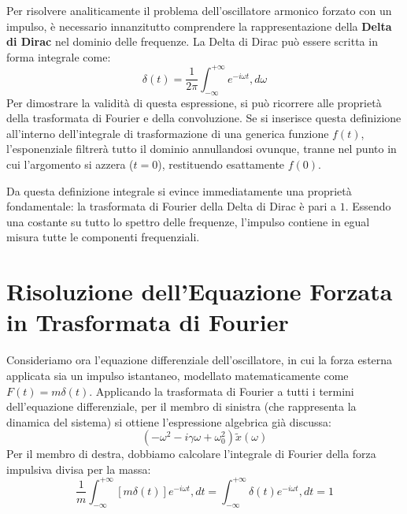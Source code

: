 Per risolvere analiticamente il problema dell'oscillatore armonico forzato con un impulso, è necessario innanzitutto comprendere la rappresentazione della \textbf{Delta di Dirac} nel dominio delle frequenze. La Delta di Dirac può essere scritta in forma integrale come:
\begin{equation}
\delta(t) = \frac{1}{2\pi} \int_{-\infty}^{+\infty} e^{-i\omega t} , d\omega
\end{equation}
Per dimostrare la validità di questa espressione, si può ricorrere alle proprietà della trasformata di Fourier e della convoluzione. Se si inserisce questa definizione all'interno dell'integrale di trasformazione di una generica funzione $f(t)$, l'esponenziale filtrerà tutto il dominio annullandosi ovunque, tranne nel punto in cui l'argomento si azzera ($t=0$), restituendo esattamente $f(0)$.

Da questa definizione integrale si evince immediatamente una proprietà fondamentale: la trasformata di Fourier della Delta di Dirac è pari a $1$. Essendo una costante su tutto lo spettro delle frequenze, l'impulso contiene in egual misura tutte le componenti frequenziali.

\section{Risoluzione dell'Equazione Forzata in Trasformata di Fourier}

Consideriamo ora l'equazione differenziale dell'oscillatore, in cui la forza esterna applicata sia un impulso istantaneo, modellato matematicamente come $F(t) = m\delta(t)$.
Applicando la trasformata di Fourier a tutti i termini dell'equazione differenziale, per il membro di sinistra (che rappresenta la dinamica del sistema) si ottiene l'espressione algebrica già discussa:
\begin{equation}
\left(-\omega^2 - i\gamma\omega + \omega_0^2\right) \tilde{x}(\omega)
\end{equation}
Per il membro di destra, dobbiamo calcolare l'integrale di Fourier della forza impulsiva divisa per la massa:
\begin{equation}
\frac{1}{m} \int_{-\infty}^{+\infty} \left[ m\delta(t) \right] e^{-i\omega t} , dt = \int_{-\infty}^{+\infty} \delta(t) e^{-i\omega t} , dt = 1
\end{equation}

